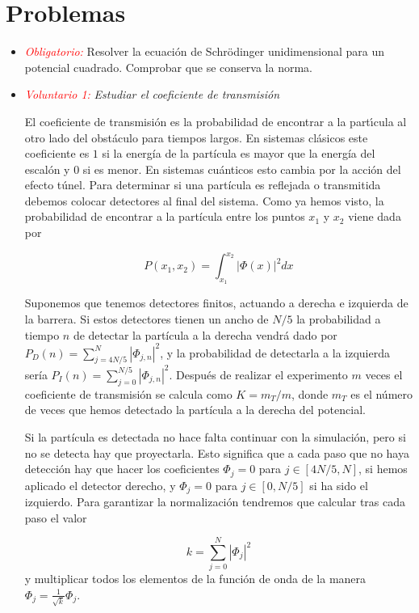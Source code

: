 \documentclass[12pt]{iopart}
\def\ro{\textcolor{red}}
\newcommand{\be}{\begin{equation}}
\newcommand{\ee}{\end{equation}}
\begin{document}
\section{Problemas}
\begin{itemize}
\item{\ro{\it Obligatorio:}} Resolver la ecuaci{\'o}n de Schr\"odinger unidimensional para un potencial cuadrado. Comprobar que se conserva la norma. 

\item{\ro{\it Voluntario 1:}} {\it Estudiar el coeficiente de transmisi{\'o}n} 

El coeficiente de  transmisi{\'o}n es la probabilidad de encontrar a la part{\'\i}cula al otro lado del obst{\'a}culo para tiempos largos. En sistemas cl{\'a}sicos este coeficiente es $1$ si la energ\'ia de la part\'icula es mayor que la energ\'ia del escal\'on y $0$ si es menor. En sistemas cu\'anticos esto cambia por la acci\'on del efecto t\'unel. Para determinar si una part\'icula es reflejada o transmitida debemos colocar detectores al final del sistema. Como ya hemos visto, la probabilidad de encontrar a la part\'icula entre los puntos $x_1$ y $x_2$ viene dada por 

\be
P(x_1,x_2)=\int_{x_1}^{x_2} \left| \Phi(x) \right|^2 dx 
\ee

Suponemos que tenemos detectores finitos, actuando a derecha e izquierda de la barrera. Si estos detectores tienen un ancho de $N/5$ la probabilidad a tiempo $n$ de detectar la part\'icula a la derecha vendr\'a dado por  $P_D(n)=\sum_{j=4N/5}^N \left|  \Phi_{j,n} \right|^2$, y la probabilidad de detectarla a la izquierda ser\'ia $P_I(n)=\sum_{j=0}^{N/5} \left|  \Phi_{j,n} \right|^2$. Despu\'es de realizar el experimento $m$ veces el coeficiente de transmisi\'on se calcula como $K=m_T/m$, donde $m_T$ es el n\'umero de veces que hemos detectado la part\'icula a la derecha del potencial. 

Si la  part\'icula es detectada no hace falta continuar con la simulaci\'on, pero si no se detecta hay que proyectarla. Esto significa que a cada paso que no haya detecci\'on hay que hacer los coeficientes $\Phi_{j}=0$ para $j \in[4N/5,N]$, si hemos aplicado el detector derecho, y $\Phi_{j}=0$ para $j \in[0,N/5]$ si ha sido el izquierdo. Para garantizar la normalizaci\'on tendremos que calcular tras cada paso el valor 

\be
k=\sum_{j=0}^N  \left| \Phi_{j}\right|^2
\ee
y multiplicar todos los elementos de la funci\'on de onda de la manera $\Phi_{j}=\frac{1}{\sqrt{k}} \Phi_{j}$.


\end{itemize}
\end{document}
